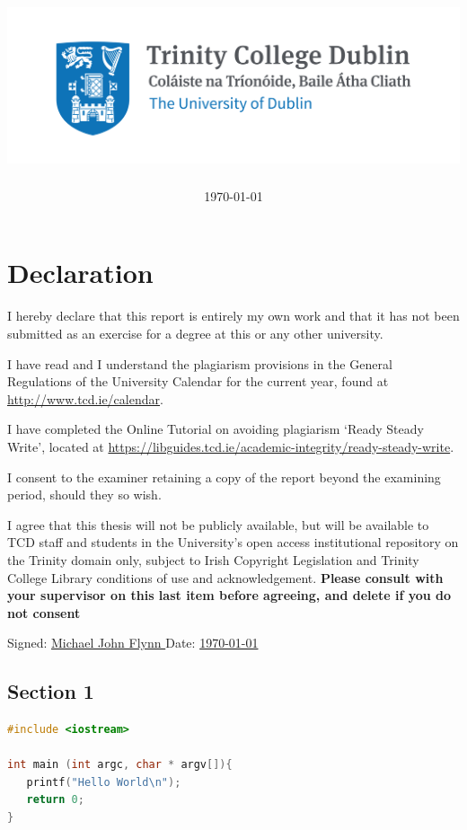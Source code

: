 \documentclass[a4paper,oneside,12pt]{article}
\date{\today}
\author{\authorname}
\title{
    \vspace{5cm}
    \includegraphics[scale=1]{images/Trinity_RGB_transparent_main.png}
    \\
    \textbf{\reportTitle}
}
\begin{document}

\maketitle

\newpage
\section*{\Huge\textcolor{tcd_blue}{Declaration}}
\vspace{1cm}
I hereby declare that this report is entirely my own work and that it has not been submitted as an exercise for a degree at this or any other university.

\vspace{1cm}
I have read and I understand the plagiarism provisions in the General Regulations of the University Calendar for the current year, found at \url{http://www.tcd.ie/calendar}.
\vspace{1cm}

I have completed the Online Tutorial on avoiding plagiarism `Ready Steady Write', located at \url{https://libguides.tcd.ie/academic-integrity/ready-steady-write}.
\vspace{1cm}

I consent to the examiner retaining a copy of the report beyond the examining period, should they so wish.
\vspace{1cm}

I agree that this thesis will not be publicly available, but will be available to TCD staff and students in the University’s open access institutional repository on the Trinity domain only, subject to Irish Copyright Legislation and Trinity College Library conditions of use and acknowledgement.  \textbf{Please consult with your supervisor on this last item before agreeing, and delete if you do not consent}
\vspace{3cm}

Signed: \uline{\hfill Michael John Flynn \hfill} \hfill Date: \uline{ \hfill \today \hfill}


\newpage

\textcolor{tcd_blue}{\section{Section 1}}

\begin{lstlisting}[language=c, caption= this is a code block]
#include <iostream>

int main (int argc, char * argv[]){
   printf("Hello World\n");
   return 0;
}
\end{lstlisting}
\end{document}
